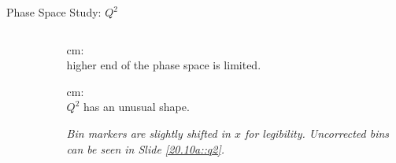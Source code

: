 \begin{frame}{Phase Space Study: $Q^2$}
    \label{12.12::q2}

    \begin{columns}[onlytextwidth,T]

    \begin{column}{.80\linewidth}
        \vspace{-15pt}
        \begin{center}
            \begin{figure}[t]
            \end{figure}
        \end{center}
    \end{column}

    \begin{column}{.18\linewidth}
        \small{ \textcolor{efd_green}{cm}: \\ higher end of the phase space is limited.}

        \vspace{12pt}

        \small{ \textcolor{efd_green}{cm}: \\ $Q^2$ has an unusual shape.}

        \vspace{12pt}

        \small{}

        \vspace{18pt}

        \begin{flushright}
            \tiny{\textit{
                Bin markers are slightly shifted in $x$ for legibility.
                Uncorrected bins can be seen in Slide \textcolor{efd_purple}{\ref{20.10a::q2}}.
            }}
        \end{flushright}
    \end{column}

    \end{columns}
\end{frame}

